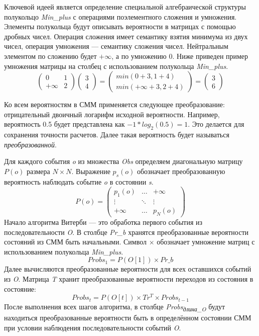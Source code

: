 Ключевой идеей является определение специальной 
алгебраической структуры полукольцо \emph{Min\_plus} 
с операциями поэлементного сложения и умножения.
Элементы полукольца будут описывать вероятности в матрицах с
помощью дробных чисел.
Операция сложения имеет семантику взятия 
минимума из двух чисел, операция умножения --- семантику 
сложения чисел.
Нейтральным элементом по сложению будет $+\infty$, 
а по умножению 0.
Ниже приведен пример умножения матрицы на столбец 
с использованием полукольца \emph{Min\_plus}.
\[
  \begin{pmatrix}
    0 & 1 \\
    +\infty & 2
  \end{pmatrix}
  \begin{pmatrix}
    3 \\
    4
  \end{pmatrix}
  =
  \begin{pmatrix}
    min(0 + 3, 1 + 4) \\
    min(+\infty + 3, 2 + 4)
  \end{pmatrix}
  =
  \begin{pmatrix}
    3 \\
    6
  \end{pmatrix}
\]

Ко всем вероятностям в СММ применяется следующее
преобразование: отрицательный двоичный логарифм 
исходной вероятности.
Например, вероятность 0.5
будет представлена как $-1 * log_2(0.5) = 1$.
Это делается для сохранения точности расчетов.
Далее такая вероятность будет называться \emph{преобразованной}.

Для каждого события \emph{o} из множества \emph{Obs} 
определяем диагональную матрицу $P(o)$ размера $N \times N$.
Выражение $p_s(o)$ обозначает преобразованную вероятность наблюдать событие \emph{o} в состоянии \emph{s}.
\[
  P(o) =
  \begin{pmatrix}
    p_{1}(o) & \hdots & +\infty \\
    \vdots & \ddots & \vdots\\
    +\infty & \hdots & p_{N}(o)
  \end{pmatrix}
\]
Начало алгоритма Витерби --- это обработка первого события из 
последовательности \emph{O}.
В столбце \emph{Pr\_b} хранятся преобразованные вероятности 
состояний из СММ быть начальными.
Символ $\times$ обозначает умножение матриц с использованием 
полукольца \emph{Min\_plus}.
\[Probs_{1} = P(O[1]) \times Pr\_b\]
Далее вычисляются преобразованные вероятности для всех 
оставшихся событий из \emph{O}.
Матрица \emph{T} хранит преобразованные вероятности 
переходов из состояния в состояние:
\[Probs_{t} = P(O[t]) \times Tr^{T} \times Probs_{t - 1}\]
После выполнения всех шагов алгоритма, в столбце 
\emph{Probs\textsubscript{длина\_O}}
будут находиться преобразованные вероятности быть в 
определённом состоянии СММ при условии наблюдения 
последовательности событий \emph{O}.


